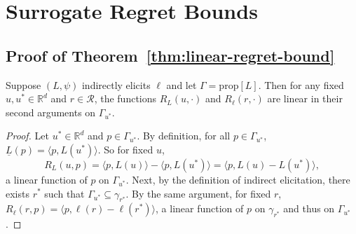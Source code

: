 \documentclass[twoside,11pt]{article}
\newcommand{\reals}{\mathbb{R}}
\newcommand{\prop}[1]{\mathrm{prop}[#1]}
\newcommand{\D}{\mathcal{D}}
\newcommand{\E}{\mathbb{E}}
\newcommand{\R}{\mathcal{R}}
\newcommand{\risk}[1]{\underline{#1}}
\newcommand{\inprod}[2]{\langle #1, #2 \rangle}%
\newcommand{\trim}{\mathrm{trim}}
\newtheorem{observation}{Observation}
\begin{document}



\section{Surrogate Regret Bounds} \label{app:regret-bounds}

\subsection{Proof of Theorem~\ref{thm:linear-regret-bound}}

\begin{lemma}\label{lem:linear-on-levelset}
  Suppose $(L,\psi)$ indirectly elicits $\ell$ and let $\Gamma = \prop{L}$.
  Then for any fixed $u,u^* \in \reals^d$ and $r \in \R$, the functions $R_L(u,\cdot)$ and $R_{\ell}(r,\cdot)$ are linear in their second arguments on $\Gamma_{u^*}$.
\end{lemma}
\begin{proof}
  Let $u^* \in \reals^d$ and $p \in \Gamma_{u^*}$.
  By definition, for all $p \in \Gamma_{u^*}$, $\risk{L}(p) = \inprod{p}{L(u^*)}$.
  So for fixed $u$,
    \[ R_L(u,p) = \inprod{p}{L(u)} - \inprod{p}{L(u^*)} = \inprod{p}{L(u) - L(u^*)} , \]
  a linear function of $p$ on $\Gamma_{u^*}$.
  Next, by the definition of indirect elicitation, there exists $r^*$ such that $\Gamma_{u^*} \subseteq \gamma_{r^*}$.
  By the same argument, for fixed $r$, $R_{\ell}(r,p) = \inprod{p}{\ell(r) - \ell(r^*)}$, a linear function of $p$ on $\gamma_{r^*}$ and thus on $\Gamma_{u^*}$.
\end{proof}
\end{document}
